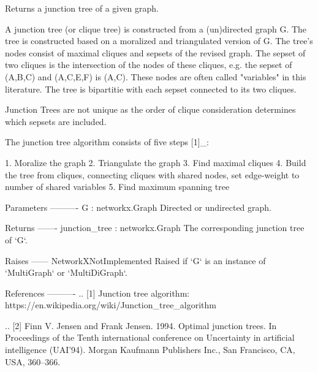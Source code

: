 \begin{DoxyVerb}Returns a junction tree of a given graph.

A junction tree (or clique tree) is constructed from a (un)directed graph G.
The tree is constructed based on a moralized and triangulated version of G.
The tree's nodes consist of maximal cliques and sepsets of the revised graph.
The sepset of two cliques is the intersection of the nodes of these cliques,
e.g. the sepset of (A,B,C) and (A,C,E,F) is (A,C). These nodes are often called
"variables" in this literature. The tree is bipartitie with each sepset
connected to its two cliques.

Junction Trees are not unique as the order of clique consideration determines
which sepsets are included.

The junction tree algorithm consists of five steps [1]_:

1. Moralize the graph
2. Triangulate the graph
3. Find maximal cliques
4. Build the tree from cliques, connecting cliques with shared
   nodes, set edge-weight to number of shared variables
5. Find maximum spanning tree


Parameters
----------
G : networkx.Graph
    Directed or undirected graph.

Returns
-------
junction_tree : networkx.Graph
    The corresponding junction tree of `G`.

Raises
------
NetworkXNotImplemented
    Raised if `G` is an instance of `MultiGraph` or `MultiDiGraph`.

References
----------
.. [1] Junction tree algorithm:
   https://en.wikipedia.org/wiki/Junction_tree_algorithm

.. [2] Finn V. Jensen and Frank Jensen. 1994. Optimal
   junction trees. In Proceedings of the Tenth international
   conference on Uncertainty in artificial intelligence (UAI’94).
   Morgan Kaufmann Publishers Inc., San Francisco, CA, USA, 360–366.
\end{DoxyVerb}
 